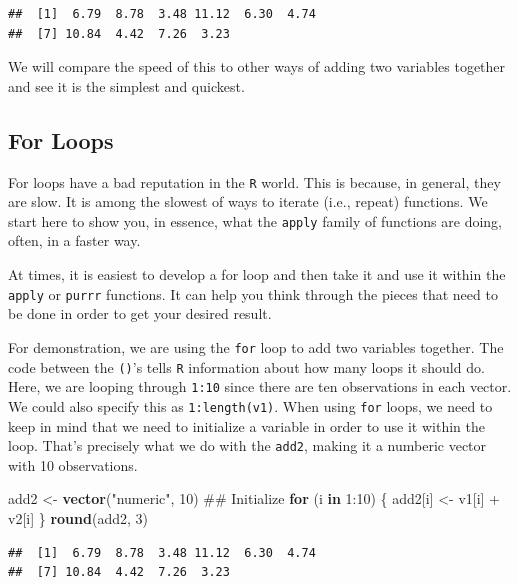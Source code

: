 \documentclass[]{tufte-book}
\newenvironment{Shaded}{}{}
\newcommand{\KeywordTok}[1]{\textcolor[rgb]{0.00,0.44,0.13}{\textbf{#1}}}
\newcommand{\DecValTok}[1]{\textcolor[rgb]{0.25,0.63,0.44}{#1}}
\newcommand{\StringTok}[1]{\textcolor[rgb]{0.25,0.44,0.63}{#1}}
\newcommand{\ControlFlowTok}[1]{\textcolor[rgb]{0.00,0.44,0.13}{\textbf{#1}}}
\newcommand{\OperatorTok}[1]{\textcolor[rgb]{0.40,0.40,0.40}{#1}}
\newcommand{\NormalTok}[1]{#1}
\theoremstyle{definition}
\theoremstyle{definition}
\theoremstyle{remark}
\begin{document}
\begin{verbatim}
##  [1]  6.79  8.78  3.48 11.12  6.30  4.74
##  [7] 10.84  4.42  7.26  3.23
\end{verbatim}

We will compare the speed of this to other ways of adding two variables
together and see it is the simplest and quickest.

\subsection*{For Loops}\label{for-loops}

For loops have a bad reputation in the \texttt{R} world. This is
because, in general, they are slow. It is among the slowest of ways to
iterate (i.e., repeat) functions. We start here to show you, in essence,
what the \texttt{apply} family of functions are doing, often, in a
faster way.

At times, it is easiest to develop a for loop and then take it and use
it within the \texttt{apply} or \texttt{purrr} functions. It can help
you think through the pieces that need to be done in order to get your
desired result.

For demonstration, we are using the \texttt{for} loop to add two
variables together. The code between the \texttt{()}'s tells \texttt{R}
information about how many loops it should do. Here, we are looping
through \texttt{1:10} since there are ten observations in each vector.
We could also specify this as \texttt{1:length(v1)}. When using
\texttt{for} loops, we need to keep in mind that we need to initialize a
variable in order to use it within the loop. That's precisely what we do
with the \texttt{add2}, making it a numberic vector with 10
observations.

\begin{Shaded}
\begin{Highlighting}[]
\NormalTok{add2 <-}\StringTok{ }\KeywordTok{vector}\NormalTok{(}\StringTok{"numeric"}\NormalTok{, }\DecValTok{10}\NormalTok{)  ## Initialize}
\ControlFlowTok{for}\NormalTok{ (i }\ControlFlowTok{in} \DecValTok{1}\OperatorTok{:}\DecValTok{10}\NormalTok{) \{}
\NormalTok{    add2[i] <-}\StringTok{ }\NormalTok{v1[i] }\OperatorTok{+}\StringTok{ }\NormalTok{v2[i]}
\NormalTok{\}}
\KeywordTok{round}\NormalTok{(add2, }\DecValTok{3}\NormalTok{)}
\end{Highlighting}
\end{Shaded}

\begin{verbatim}
##  [1]  6.79  8.78  3.48 11.12  6.30  4.74
##  [7] 10.84  4.42  7.26  3.23
\end{verbatim}
\end{document}
